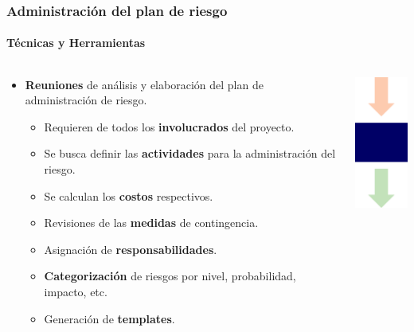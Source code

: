 \begin{frame}
\frametitle{Administración del plan de riesgo}
\framesubtitle{Técnicas y Herramientas}
\begin{columns}
	\begin{column}{0.8\textwidth}
\begin{itemize}
    \item \textbf{Reuniones} de análisis y elaboración del plan de administración de riesgo.
    \begin{itemize}
        \item<1-> Requieren de todos los \textbf{involucrados} del proyecto.
        \item<2-> Se busca definir las \textbf{actividades} para la administración del riesgo.
        \item<3-> Se calculan los \textbf{costos} respectivos.
        \item<4-> Revisiones de las \textbf{medidas} de contingencia.
        \item<5-> Asignación de \textbf{responsabilidades}.
        \item<6-> \textbf{Categorización} de riesgos por nivel, probabilidad, impacto, etc.
        \item<7-> Generación de \textbf{templates}.
    \end{itemize}
\end{itemize}
	\end{column}
	\begin{column}{0.2\textwidth}
		\includegraphics[width=2cm]{img/tools}
	\end{column}
\end{columns}
\end{frame}

